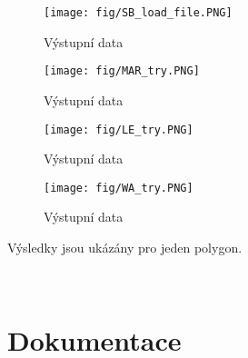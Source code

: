 \documentclass[oneside,12pt,a4paper]{book}
\begin{document}
\begin{figure}[ht!]
    \centering
    \texttt{[image: fig/SB\_load\_file.PNG]}
    \caption{Výstupní data}
    \label{fig:Výstupní data - nahrání souboru}
\end{figure}
\begin{figure}[ht!]
    \centering
    \texttt{[image: fig/MAR\_try.PNG]}
    \caption{Výstupní data}
    \label{fig:Výstupní data - Minimum Area Rectangle}
\end{figure}
\begin{figure}[ht!]
    \centering
    \texttt{[image: fig/LE\_try.PNG]}
    \caption{Výstupní data}
    \label{fig:Výstupní data - Longest Edge}
\end{figure}
\begin{figure}[ht!]
    \centering
    \texttt{[image: fig/WA\_try.PNG]}
    \caption{Výstupní data}
    \label{fig:Výstupní data - Wall Average}
\end{figure}

Výsledky jsou ukázány pro jeden polygon.\par
\\ 
\pagebreak

\clearpage
\chapter{Dokumentace} 
\end{document}

